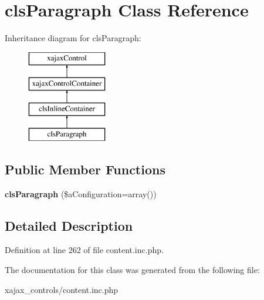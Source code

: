 \hypertarget{classclsParagraph}{
\section{clsParagraph Class Reference}
\label{classclsParagraph}
}
Inheritance diagram for clsParagraph:\begin{figure}[H]
\begin{center}
\leavevmode
\includegraphics[height=4.000000cm]{classclsParagraph}
\end{center}
\end{figure}
\subsection*{Public Member Functions}
\begin{DoxyCompactItemize}
\item 
\hypertarget{classclsParagraph_a2f52d411d6599f5453b7c823d26d36a3}{
{\bfseries clsParagraph} (\$aConfiguration=array())}
\label{classclsParagraph_a2f52d411d6599f5453b7c823d26d36a3}

\end{DoxyCompactItemize}


\subsection{Detailed Description}


Definition at line 262 of file content.inc.php.



The documentation for this class was generated from the following file:\begin{DoxyCompactItemize}
\item 
xajax\_\-controls/content.inc.php\end{DoxyCompactItemize}
